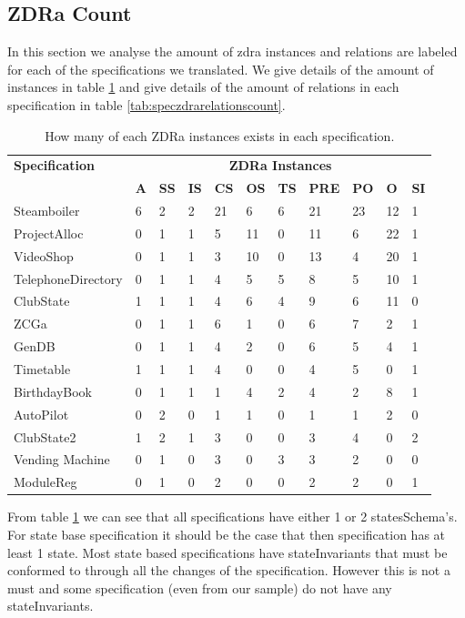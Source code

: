 \subsection{ZDRa Count}

In this section we analyse the amount of \gls{zdra} instances and relations are labeled for each of the specifications we translated. We give details of the amount of instances in table \ref{tab:speczdracount} and give details of the amount of relations in each specification in table \ref{tab:speczdrarelationscount}.

\begin{table}[H]
\centering
\begin{tabular}{|l |l | l |l | l| l | l | l | l | l | l |}
\hline
\textbf{Specification} & \multicolumn{10}{c|}{\textbf{ZDRa Instances}}\\
\cline{2-11}
 & \textbf{A} & \textbf{SS} & \textbf{IS} & \textbf{CS} & \textbf{OS} & \textbf{TS} & \textbf{PRE} & \textbf{PO} & \textbf{O} & \textbf{SI}  \\
\hline
Steamboiler & 6 & 2 & 2 & 21 & 6 & 6 & 21 & 23 & 12 & 1  \\
ProjectAlloc & 0 & 1 & 1 & 5 & 11 & 0 & 11 & 6 & 22 & 1 \\
VideoShop &  0 & 1 & 1 & 3 & 10 & 0 & 13 & 4 & 20 & 1  \\
TelephoneDirectory & 0 & 1 & 1 & 4 & 5 & 5 & 8 & 5 & 10 & 1 \\
ClubState & 1 & 1 & 1 & 4 & 6 & 4 & 9 & 6 & 11 & 0 \\
ZCGa & 0 & 1 & 1 & 6 & 1 & 0 & 6 & 7 & 2 & 1 \\
GenDB & 0 & 1 & 1 & 4 & 2 & 0 & 6 & 5 & 4 & 1 \\
Timetable & 1 & 1 & 1 & 4 & 0 & 0 & 4 & 5 & 0 & 1 \\
BirthdayBook & 0 & 1 & 1 & 1 & 4 & 2 & 4 & 2 & 8 & 1 \\
AutoPilot & 0 & 2 & 0 & 1 & 1 & 0 & 1 & 1 & 2 & 0 \\
ClubState2 & 1 & 2 & 1 & 3 & 0 & 0 & 3 & 4 & 0 & 2 \\
Vending Machine & 0 & 1 & 0 & 3 & 0 & 3 & 3 & 2 & 0 & 0 \\
ModuleReg & 0 & 1 & 0 & 2 & 0 & 0 & 2 & 2 & 0 & 1 \\
\hline
\end{tabular}
\caption{How many of each ZDRa instances exists in each specification. \label{tab:speczdracount}}
\end{table}

From table \ref{tab:speczdracount} we can see that all specifications have either 1 or 2 statesSchema's. For state base specification it should be the case that then specification has at least 1 state. Most state based specifications have stateInvariants that must be conformed to through all the changes of the specification. However this is not a must and some specification (even from our sample) do not have any stateInvariants. 

